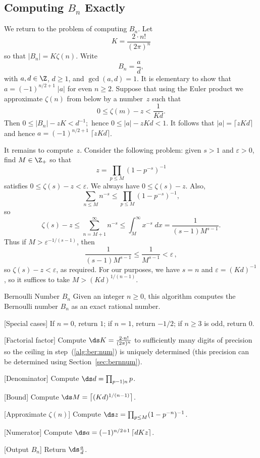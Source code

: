 \subsection{Computing $B_n$ Exactly}
We return to the problem of computing $B_n$.  Let
$$
  K=\frac{2\cdot n!}{(2\pi)^n}
$$
so that $|B_n|=K\zeta(n)$.
Write
$$
  B_n=\frac{a}{d},
$$
with $a,d\in\Z$, $d\geq 1$, and $\gcd(a,d)=1$.  
It is elementary
to show that $a=(-1)^{n/2+1}\;|a|$ for even $n\geq 2$. 
Suppose that using the Euler product we approximate
$\zeta(n)$ from below by a number~$z$ such that
$$
  0\leq \zeta(m)-z<\frac{1}{Kd}.
$$
Then 
$
  0\leq |B_n| - zK < d^{-1};
$
hence
$
  0\leq |a| - zKd < 1.
$
It follows that $|a|=\lceil zKd\rceil$
and hence $a=(-1)^{n/2+1}\;\lceil zKd\rceil$.

It remains to compute~$z$.
Consider the following problem:
given $s>1$ and
$\varepsilon>0$, find $M\in\Z_+$ so that
$$
  z=\prod_{p\leq M} (1-p^{-s})^{-1}
$$
satisfies $0\leq\zeta(s)-z<\varepsilon$.
We always have $0\leq\zeta(s)-z$.
Also,
$$
  \sum_{n\leq M} n^{-s}\leq\prod_{p\leq M} (1-p^{-s})^{-1},
$$
so
$$
  \zeta(s)-z \leq
  \sum_{n=M+1}^\infty n^{-s}
\leq
  \int_M^\infty x^{-s}\;dx
=
  \frac{1}{(s-1)M^{s-1}}.
$$
Thus if $M>\varepsilon^{-1/(s-1)}$, then
$$
  \frac{1}{(s-1)M^{s-1}}
  \leq
  \frac{1}{M^{s-1}}
  <
  \varepsilon
  \,,
$$
so
$\zeta(s)-z<\varepsilon$, as required.
For our purposes, we have $s=n$ and $\varepsilon=(Kd)^{-1}$,
so it suffices to take $M>(Kd)^{1/(n-1)}$.

\begin{algorithm}{Bernoulli Number $B_n$}\label{alg:ber}
Given an integer $n\geq 0$, this algorithm computes
the Bernoulli number $B_n$ as an exact rational number. 
\begin{steps}
\item{}[Special cases] If $n=0$, return $1$; if $n=1$, return $-1/2$;
if $n\geq 3$ is odd, return $0$.
  \item{}[Factorial factor]\label{alg:ber:compk} 
Compute $\ds K=\frac{2 \cdot n!}{(2\pi)^n}$ to sufficiently many
digits of precision so the ceiling in step~(\ref{alg:ber:num}) is
uniquely determined (this precision can be determined using
Section~\ref{sec:bernnum}). 
  \item{}[Denominator] Compute $\ds d=\prod_{p-1 | n} p$.
  \item{}[Bound]\label{alg:ber:compM} 
                  Compute $\ds M = \left\lceil (K d)^{1/(n-1)} \right\rceil$.
  \item{}[Approximate $\zeta(n)$]\label{alg:ber:approx} 
              Compute $\ds z = \prod_{p\leq M} (1-p^{-n})^{-1}$.
  \item{}[Numerator]\label{alg:ber:num} 
    Compute $\ds a = (-1)^{n/2+1}\,\lceil d K z \rceil$.
  \item{}[Output $B_n$] Return $\ds \frac{a}{d}$.
\end{steps}
\end{algorithm}

